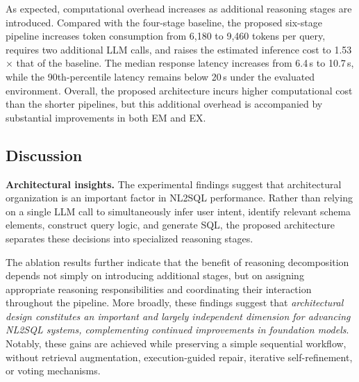 \documentclass{svproc}
\begin{document}
As expected, computational overhead increases as additional reasoning stages are introduced. Compared with the four-stage baseline, the proposed six-stage pipeline increases token consumption from 6,180 to 9,460 tokens per query, requires two additional LLM calls, and raises the estimated inference cost to 1.53$\times$ that of the baseline. The median response latency increases from 6.4\,s to 10.7\,s, while the 90th-percentile latency remains below 20\,s under the evaluated environment. Overall, the proposed architecture incurs higher computational cost than the shorter pipelines, but this additional overhead is accompanied by substantial improvements in both EM and EX.




\subsection{Discussion}
\label{subsec:discussion}

\textbf{Architectural insights.}
The experimental findings suggest that architectural organization is an important factor in NL2SQL performance. Rather than relying on a single LLM call to simultaneously infer user intent, identify relevant schema elements, construct query logic, and generate SQL, the proposed architecture separates these decisions into specialized reasoning stages.

The ablation results further indicate that the benefit of reasoning decomposition depends not simply on introducing additional stages, but on assigning appropriate reasoning responsibilities and coordinating their interaction throughout the pipeline. More broadly, these findings suggest that \textit{architectural design constitutes an important and largely independent dimension for advancing NL2SQL systems, complementing continued improvements in foundation models}. Notably, these gains are achieved while preserving a simple sequential workflow, without retrieval augmentation, execution-guided repair, iterative self-refinement, or voting mechanisms.
\end{document}
